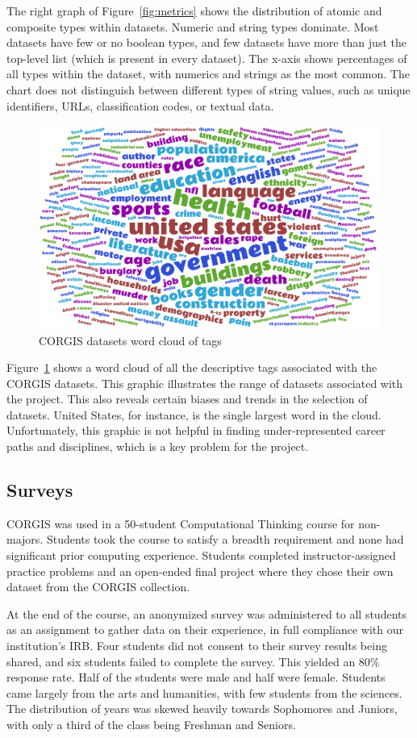 \documentclass{sig-alternate}
\begin{document}
The right graph of Figure~\ref{fig:metrics} shows the distribution of atomic and composite types within datasets.
Numeric and string types dominate.
Most datasets have few or no boolean types, and few datasets have more than just the top-level list (which is present in every dataset).
The x-axis shows percentages of all types within the dataset, with numerics and strings as the most common.
The chart does not distinguish between different types of string values, such as unique identifiers, URLs, classification codes, or textual data.

\begin{figure}[ht!]
    \centering
    \includegraphics[width=.47\textwidth]{graphics/corgis-cloud-color}
    \caption{CORGIS datasets word cloud of tags}
    \label{fig:corgis-cloud}
\end{figure}

Figure~\ref{fig:corgis-cloud} shows a word cloud of all the descriptive tags associated with the CORGIS datasets.
This graphic illustrates the range of datasets associated with the project.
This also reveals certain biases and trends in the selection of datasets.
United States, for instance, is the single largest word in the cloud.
Unfortunately, this graphic is not helpful in finding under-represented career paths and disciplines, which is a key problem for the project.

\subsection{Surveys}

CORGIS was used in a 50-student Computational Thinking course for non-majors.
Students took the course to satisfy a breadth requirement and none had significant prior computing experience.
Students completed instructor-ass\-ign\-ed practice problems and an open-ended final project where they chose their own dataset from the CORGIS collection.

At the end of the course, an anonymized survey was administered to all students as an assignment to gather data on their experience, in full compliance with our institution's IRB.
Four students did not consent to their survey results being shared, and six students failed to complete the survey.
This yielded an 80\% response rate.
Half of the students were male and half were female.
Students came largely from the arts and humanities, with few students from the sciences.
The distribution of years was skewed heavily towards Sophomores and Juniors, with only a third of the class being Freshman and Seniors.
\end{document}
